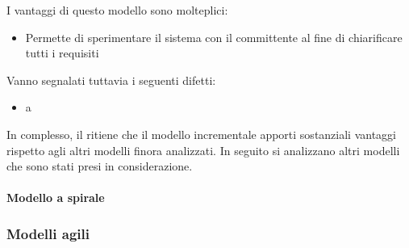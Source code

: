 I vantaggi di questo modello sono molteplici:
\begin{itemize}
\item Permette di sperimentare il sistema con il committente al fine di chiarificare tutti i requisiti
\end{itemize}

Vanno segnalati tuttavia i seguenti difetti:
\begin{itemize}
\item a
\end{itemize}

In complesso, il  ritiene che il modello incrementale apporti sostanziali vantaggi rispetto agli altri modelli finora analizzati. In seguito si analizzano altri modelli che sono stati presi in considerazione.

			\paragraph{Modello a spirale}
		\subsubsection{Modelli agili}




